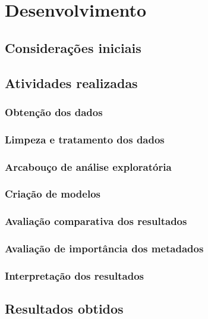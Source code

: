 

\chapter[Desenvolvimento]{Desenvolvimento}

    \section{Considerações iniciais}
    
    \section{Atividades realizadas}
    
        \subsection{Obtenção dos dados}

        \subsection{Limpeza e tratamento dos dados}

        \subsection{Arcabouço de análise exploratória}

        \subsection{Criação de modelos}

        \subsection{Avaliação comparativa dos resultados}

        \subsection{Avaliação de importância dos metadados}

        \subsection{Interpretação dos resultados}

    \section{Resultados obtidos}


